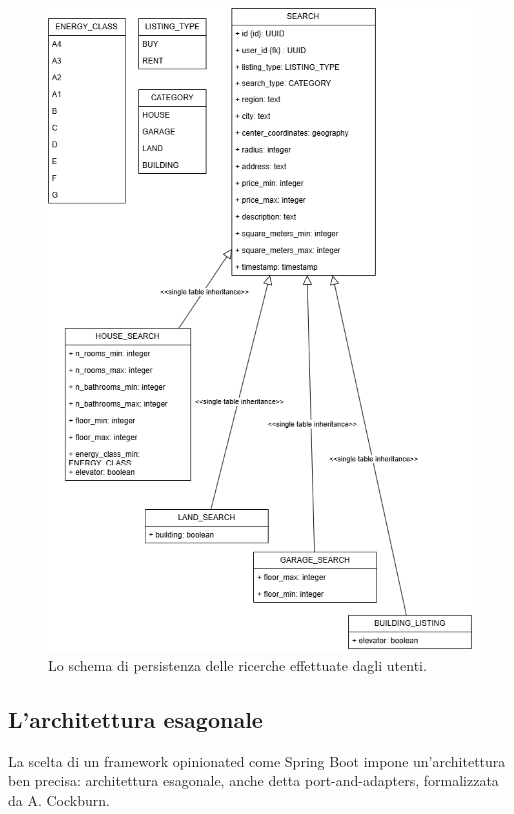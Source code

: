 \begin{figure}[h]
    \centering
    \includegraphics[width=\textwidth]{assets/diagrams/db-scheme/search.png}
    \caption{Lo schema di persistenza delle ricerche effettuate dagli utenti.}
    \label{fig:Schema di persistenza delle ricerche effettuate dagli utenti}
\end{figure}

\subsection{L'architettura esagonale}
La scelta di un framework opinionated come Spring Boot impone un’architettura ben precisa: 
architettura esagonale, anche detta port-and-adapters, formalizzata da A. Cockburn.

